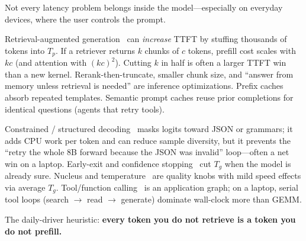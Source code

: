 Not every latency problem belongs inside the model---especially on everyday devices, where the user controls the prompt.

Retrieval-augmented generation~\citep{lewis2020rag} can \emph{increase} TTFT by stuffing thousands of tokens into \(T_p\). If a retriever returns \(k\) chunks of \(c\) tokens, prefill cost scales with \(kc\) (and attention with \((kc)^2\)). Cutting \(k\) in half is often a larger TTFT win than a new kernel. Rerank-then-truncate, smaller chunk size, and ``answer from memory unless retrieval is needed'' are inference optimizations. Prefix caches absorb repeated templates. Semantic prompt caches reuse prior completions for identical questions (agents that retry tools).

Constrained / structured decoding~\citep{willard2023outlines,zheng2024sglang} masks logits toward JSON or grammars; it adds CPU work per token and can reduce sample diversity, but it prevents the ``retry the whole 8B forward because the JSON was invalid'' loop---often a net win on a laptop. Early-exit and confidence stopping~\citep{schuster2022confident} cut \(T_g\) when the model is already sure. Nucleus and temperature~\citep{holtzman2020nucleus} are quality knobs with mild speed effects via average \(T_g\). Tool/function calling~\citep{alizadeh2024llmcompiler} is an application graph; on a laptop, serial tool loops (search \(\rightarrow\) read \(\rightarrow\) generate) dominate wall-clock more than GEMM.

The daily-driver heuristic: \textbf{every token you do not retrieve is a token you do not prefill.}
